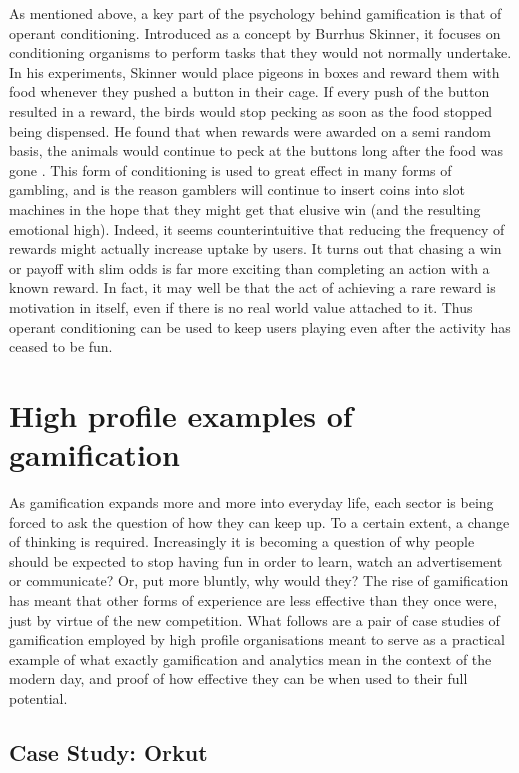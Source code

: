 \documentclass[12pt,a4paper,twoside]{report}
\begin{document}
As mentioned above, a key part of the psychology behind gamification is that of operant conditioning. Introduced as a concept by Burrhus Skinner, it focuses on conditioning organisms to perform tasks that they would not normally undertake. In his experiments, Skinner would place pigeons in boxes and reward them with food whenever they pushed a button in their cage. If every push of the button resulted in a reward, the birds would stop pecking as soon as the food stopped being dispensed. He found that when rewards were awarded on a semi random basis, the animals would continue to peck at the buttons long after the food was gone \cite{kapp2012gamification}. This form of conditioning is used to great effect in many forms of gambling, and is the reason gamblers will continue to insert coins into slot machines in the hope that they might get that elusive win (and the resulting emotional high). Indeed, it seems counterintuitive that reducing the frequency of rewards might actually increase uptake by users. It turns out that chasing a win or payoff with slim odds is far more exciting than completing an action with a known reward. In fact, it may well be that the act of achieving a rare reward is motivation in itself, even if there is no real world value attached to it. Thus operant conditioning can be used to keep users playing even after the activity has ceased to be fun.

\section{High profile examples of gamification}
As gamification expands more and more into everyday life, each sector is being forced to ask the question of how they can keep up. To a certain extent, a change of thinking is required. Increasingly it is becoming a question of why people should be expected to stop having fun in order to learn, watch an advertisement or communicate? \cite{zichermann2010game} Or, put more bluntly, why would they? The rise of gamification has meant that other forms of experience are less effective than they once were, just by virtue of the new competition. What follows are a pair of case studies of gamification employed by high profile organisations meant to serve as a practical example of what exactly gamification and analytics mean in the context of the modern day, and proof of how effective they can be when used to their full potential.

\subsection{Case Study: Orkut}
\end{document}
